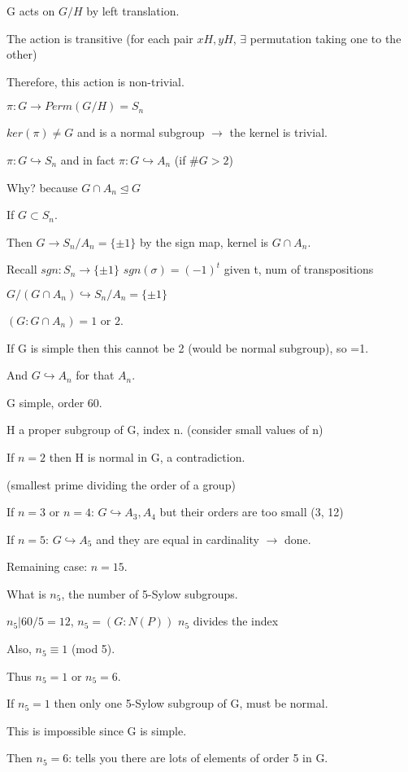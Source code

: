 \documentclass[12pt]{article}
\begin{document}
G acts on $G\slash H$ by left translation.

The action is transitive (for each pair $xH, yH$, $\exists$ permutation taking one to the other)

Therefore, this action is non-trivial.

$\pi : G \to Perm(G\slash H) = S_n$

$ker(\pi) \neq G$ and is a normal subgroup $\to$ the kernel is trivial.

$\pi: G \hookrightarrow S_n$ and in fact $\pi: G \hookrightarrow A_n$ (if $\#G > 2$)

\noindent
Why? because $G \cap A_n \trianglelefteq G$

If $G \subset S_n$.

Then $G \to S_n/A_n = \{\pm 1\}$ by the sign map, kernel is $G \cap A_n$.

Recall $sgn: S_n \to \{\pm 1\}$ $sgn(\sigma) = (-1)^t$ given t, num of transpositions

$G/(G \cap A_n) \hookrightarrow S_n/A_n = \{\pm 1\}$

$(G : G \cap A_n) = 1$ or $2$.

If G is simple then this cannot be 2 (would be normal subgroup), so =1.

And $G \hookrightarrow A_n$ for that $A_n$.

\noindent
G simple, order 60.

H a proper subgroup of G, index n.  (consider small values of n)

If $n = 2$ then H is normal in G, a contradiction.

(smallest prime dividing the order of a group)

If $n = 3$ or $n = 4$: $G \hookrightarrow A_3, A_4$ but their orders are too small (3, 12)

If $n = 5$: $G \hookrightarrow A_5$ and they are equal in cardinality $\to$ done.

Remaining case: $n = 15$.

What is $n_5$, the number of 5-Sylow subgroups.

$n_5 | 60\slash 5 = 12$, $n_5 = (G : N(P))$ $n_5$ divides the index

Also, $n_5 \equiv 1$ (mod 5).

Thus $n_5 = 1$ or $n_5 = 6$.

If $n_5 = 1$ then only one 5-Sylow subgroup of G, must be normal.

This is impossible since G is simple.

Then $n_5 = 6$: tells you there are lots of elements of order 5 in G.
\end{document}
